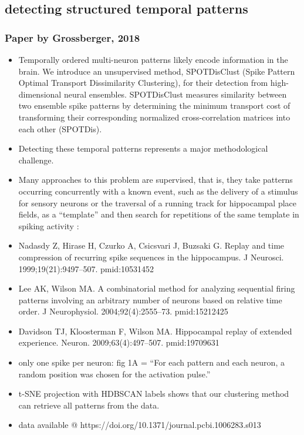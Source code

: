 \documentclass[brainsci, %
               review,submit,pdftex,moreauthors%
               ]{Definitions/mdpi}
\begin{document}
\subsection{detecting structured temporal patterns}
\subsubsection{Paper by Grossberger, 2018~\citep{grossberger_unsupervised_2018}}
\begin{itemize}
 \item
  Temporally ordered multi-neuron patterns likely encode information in the brain. We introduce an unsupervised method, SPOTDisClust (Spike Pattern Optimal Transport Dissimilarity Clustering), for their detection from high-dimensional neural ensembles. SPOTDisClust measures similarity between two ensemble spike patterns by determining the minimum transport cost of transforming their corresponding normalized cross-correlation matrices into each other (SPOTDis).
\item
  Detecting these temporal patterns represents a major methodological challenge.
\item
  Many approaches to this problem are supervised, that is, they take patterns occurring concurrently with a known event, such as the delivery of a stimulus for sensory neurons or the traversal of a running track for hippocampal place fields, as a ``template'' and then search for repetitions of the same template in spiking activity :
\item
  Nadasdy Z, Hirase H, Czurko A, Csicsvari J, Buzsaki G. Replay and time compression of recurring spike sequences in the hippocampus. J Neurosci. 1999;19(21):9497--507. pmid:10531452
\item
  Lee AK, Wilson MA. A combinatorial method for analyzing sequential firing patterns involving an arbitrary number of neurons based on relative time order. J Neurophysiol. 2004;92(4):2555--73. pmid:15212425
\item
  Davidson TJ, Kloosterman F, Wilson MA. Hippocampal replay of extended experience. Neuron. 2009;63(4):497--507. pmid:19709631
\item
  only one spike per neuron: fig 1A = ``For each pattern and each neuron, a random position was chosen for the activation pulse.''
\item
  t-SNE projection with HDBSCAN labels shows that our clustering method can retrieve all patterns from the data.
\item
  data available @ https://doi.org/10.1371/journal.pcbi.1006283.s013
\end{itemize}
\end{document}
